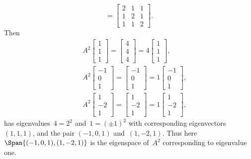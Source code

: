 \begin{example}
\begin{solution}
\begin{itemize}
\begin{equation*}
=\begin{bmatrix} 2&1&1\\1&2&1\\1&1&2 \end{bmatrix}.
\end{equation*}
Then
\begin{eqnarray*}
&&A^2\begin{bmatrix} 1\\1\\1 \end{bmatrix}
=\begin{bmatrix} 4\\4\\4 \end{bmatrix}
=4\begin{bmatrix} 1\\1\\1 \end{bmatrix},
\\&&A^2\begin{bmatrix} -1\\0\\1 \end{bmatrix}
=\begin{bmatrix} -1\\0\\1 \end{bmatrix}
=1\begin{bmatrix} -1\\0\\1 \end{bmatrix},
\\&&A^2\begin{bmatrix} 1\\-2\\1 \end{bmatrix}
=\begin{bmatrix} 1\\-2\\1 \end{bmatrix}
=1\begin{bmatrix} 1\\-2\\1 \end{bmatrix},
\end{eqnarray*}
has eigenvalues~\(4=2^2\) and~\(1=(\pm1)^2\) with corresponding eigenvectors \((1,1,1)\), and the pair \((-1,0,1)\) and~\((1,-2,1)\).
Thus here \(\Span\{(-1,0,1),(1,-2,1)\}\) is the eigenspace of~\(A^2\) corresponding to eigenvalue one.


\end{itemize}
\end{solution}
\end{example}
